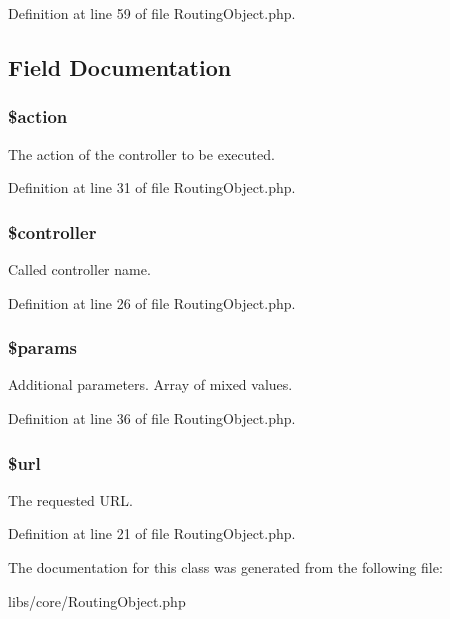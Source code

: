 \-Definition at line 59 of file \-Routing\-Object.\-php.



\subsection{\-Field \-Documentation}
\hypertarget{class_routing_object_aa698a3e72116e8e778be0e95d908ee30}{
\subsubsection[{\$action}]{\setlength{\rightskip}{0pt plus 5cm}\$action}}\label{class_routing_object_aa698a3e72116e8e778be0e95d908ee30}
\-The action of the controller to be executed. 

\-Definition at line 31 of file \-Routing\-Object.\-php.

\hypertarget{class_routing_object_a388ef7b1db5e6f728e63cee704ce6e23}{
\subsubsection[{\$controller}]{\setlength{\rightskip}{0pt plus 5cm}\$controller}}\label{class_routing_object_a388ef7b1db5e6f728e63cee704ce6e23}
\-Called controller name. 

\-Definition at line 26 of file \-Routing\-Object.\-php.

\hypertarget{class_routing_object_afe68e6fbe7acfbffc0af0c84a1996466}{
\subsubsection[{\$params}]{\setlength{\rightskip}{0pt plus 5cm}\$params}}\label{class_routing_object_afe68e6fbe7acfbffc0af0c84a1996466}
\-Additional parameters. \-Array of mixed values. 

\-Definition at line 36 of file \-Routing\-Object.\-php.

\hypertarget{class_routing_object_acf215f34a917d014776ce684a9ee8909}{
\subsubsection[{\$url}]{\setlength{\rightskip}{0pt plus 5cm}\$url}}\label{class_routing_object_acf215f34a917d014776ce684a9ee8909}
\-The requested \-U\-R\-L. 

\-Definition at line 21 of file \-Routing\-Object.\-php.



\-The documentation for this class was generated from the following file\-:\begin{DoxyCompactItemize}
\item 
libs/core/\-Routing\-Object.\-php\end{DoxyCompactItemize}
